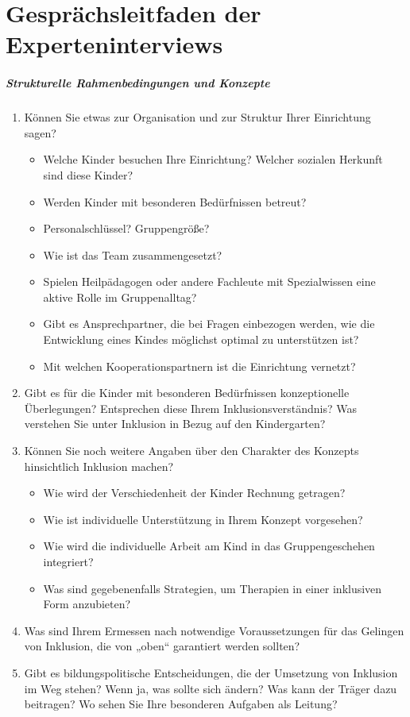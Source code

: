 \chapter{Gesprächsleitfaden der Experteninterviews}
\paragraph{Strukturelle Rahmenbedingungen und Konzepte}
\begin{enumerate}
\item Können Sie etwas zur Organisation und zur Struktur Ihrer Einrichtung sagen?
\begin{itemize}
\item Welche Kinder besuchen Ihre Einrichtung? Welcher sozialen Herkunft sind diese Kinder? 
\item Werden Kinder mit besonderen Bedürfnissen betreut?
\item Personalschlüssel? Gruppengröße?
\item Wie ist das Team zusammengesetzt?
\item Spielen Heilpädagogen oder andere Fachleute mit Spezialwissen eine aktive Rolle im Gruppenalltag?
\item Gibt es Ansprechpartner, die bei Fragen einbezogen werden, wie die Entwicklung eines Kindes möglichst optimal zu unterstützen ist? 
\item Mit welchen Kooperationspartnern ist die Einrichtung vernetzt?
\end{itemize}
\item Gibt es für die Kinder mit besonderen Bedürfnissen konzeptionelle Überlegungen? Entsprechen diese Ihrem Inklusionsverständnis?
Was verstehen Sie unter Inklusion in Bezug auf den Kindergarten? 
\item Können Sie noch weitere Angaben über den Charakter des Konzepts hinsichtlich Inklusion machen?
\begin{itemize}
\item Wie wird der Verschiedenheit der Kinder Rechnung getragen?
\item Wie ist individuelle Unterstützung in Ihrem Konzept vorgesehen?
\item Wie wird die individuelle Arbeit am Kind in das Gruppengeschehen integriert?
\item Was sind gegebenenfalls Strategien, um Therapien in einer inklusiven Form anzubieten?
\end{itemize}
\item Was sind Ihrem Ermessen nach notwendige Voraussetzungen für das Gelingen von Inklusion, die von „oben“ garantiert werden sollten? 
\item Gibt es bildungspolitische Entscheidungen, die der Umsetzung von Inklusion im Weg stehen? 
Wenn ja, was sollte sich ändern? 
Was kann der Träger dazu beitragen? 
Wo sehen Sie Ihre besonderen Aufgaben als Leitung?
\end{enumerate}

